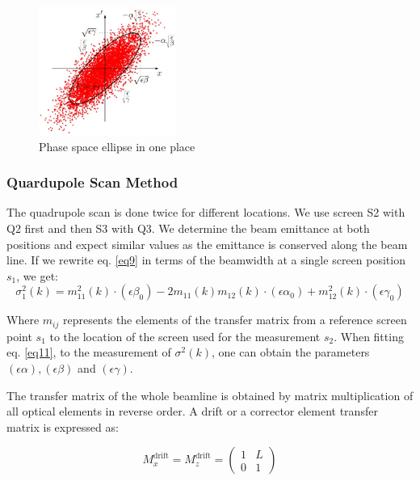 \documentclass[12pt]{article}
\begin{document}
\begin{figure}[H]
    \centering
    \includegraphics[width = 0.4\textwidth]{fig/phase space.jpg}
    \caption{Phase space ellipse in one place}
    \label{phase space}
\end{figure}

\subsubsection{Quardupole Scan Method}
The quadrupole scan is done twice for different locations. We use screen S2 with Q2 first and then S3 with Q3. We determine the beam emittance at both positions and expect similar values as the emittance is conserved along the beam line. 
If we rewrite eq. \ref{eq9} in terms of the beamwidth at a single screen position $s_1$, we get:
\begin{equation}
    \sigma_1^2(k)=m_{11}^2(k) \cdot\left(\epsilon \beta_0\right)-2 m_{11}(k) m_{12}(k) \cdot\left(\epsilon \alpha_0\right)+m_{12}^2(k) \cdot\left(\epsilon \gamma_0\right)
    \label{eq11}
\end{equation}

Where $m_{ij}$ represents the elements of the transfer matrix from a reference screen point $s_1$ to the location of the screen used for the measurement $s_2$.  When fitting eq. \ref{eq11}, to the measurement of $\sigma^{2}(k)$, one can obtain the parameters $(\epsilon \alpha),(\epsilon \beta)$ and $(\epsilon \gamma)$. 

The transfer matrix of the whole beamline is obtained by matrix multiplication of all optical elements in reverse order. A drift or a corrector element transfer matrix is expressed as:


\begin{equation}
M_x^{\mathrm{drift}}=M_z^{\mathrm{drift}}=\left(\begin{array}{ll}
1 & L \\
0 & 1
\end{array}\right)
\label{eq12}
\end{equation}
\end{document}
